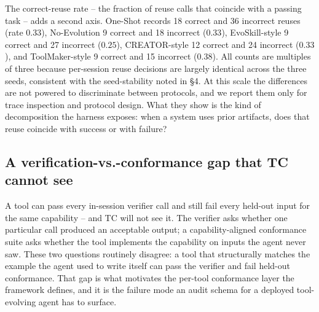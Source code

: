 \documentclass[sigconf,anonymous,review,natbib=false]{acmart}
\begin{document}
The correct-reuse rate -- the fraction of reuse calls that coincide with a passing task -- adds a second axis. One-Shot records 18 correct and 36 incorrect reuses (rate $0.33$), No-Evolution 9 correct and 18 incorrect ($0.33$), EvoSkill-style 9 correct and 27 incorrect ($0.25$), CREATOR-style 12 correct and 24 incorrect ($0.33$), and ToolMaker-style 9 correct and 15 incorrect ($0.38$). All counts are multiples of three because per-session reuse decisions are largely identical across the three seeds, consistent with the seed-stability noted in \S4. At this scale the differences are not powered to discriminate between protocols, and we report them only for trace inspection and protocol design. What they show is the kind of decomposition the harness exposes: when a system uses prior artifacts, does that reuse coincide with success or with failure?

\subsection{A verification-vs.-conformance gap that TC cannot see}
\label{sec:gap}

A tool can pass every in-session verifier call and still fail every held-out input for the same capability -- and TC will not see it. The verifier asks whether one particular call produced an acceptable output; a capability-aligned conformance suite asks whether the tool implements the capability on inputs the agent never saw. These two questions routinely disagree: a tool that structurally matches the example the agent used to write itself can pass the verifier and fail held-out conformance. That gap is what motivates the per-tool conformance layer the framework defines, and it is the failure mode an audit schema for a deployed tool-evolving agent has to surface.
\end{document}
